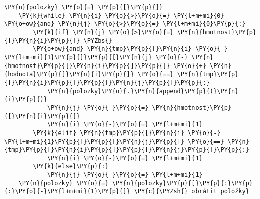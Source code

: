 \begin{Verbatim}[commandchars=\\\{\}]
	\PY{n}{polozky} \PY{o}{=} \PY{p}{[}\PY{p}{]}
	\PY{k}{while} \PY{n}{i} \PY{o}{>}\PY{o}{=} \PY{l+m+mi}{0} \PY{o+ow}{and} \PY{n}{j} \PY{o}{>}\PY{o}{=} \PY{l+m+mi}{0}\PY{p}{:}
		\PY{k}{if} \PY{n}{j} \PY{o}{>}\PY{o}{=} \PY{n}{hmotnost}\PY{p}{[}\PY{n}{i}\PY{p}{]} \PYZbs{}
		\PY{o+ow}{and} \PY{n}{tmp}\PY{p}{[}\PY{n}{i} \PY{o}{-} \PY{l+m+mi}{1}\PY{p}{]}\PY{p}{[}\PY{n}{j} \PY{o}{-} \PY{n}{hmotnost}\PY{p}{[}\PY{n}{i}\PY{p}{]}\PY{p}{]} \PY{o}{+} \PY{n}{hodnota}\PY{p}{[}\PY{n}{i}\PY{p}{]} \PY{o}{==} \PY{n}{tmp}\PY{p}{[}\PY{n}{i}\PY{p}{]}\PY{p}{[}\PY{n}{j}\PY{p}{]}\PY{p}{:}
			\PY{n}{polozky}\PY{o}{.}\PY{n}{append}\PY{p}{(}\PY{n}{i}\PY{p}{)}
			\PY{n}{j} \PY{o}{-}\PY{o}{=} \PY{n}{hmotnost}\PY{p}{[}\PY{n}{i}\PY{p}{]}
			\PY{n}{i} \PY{o}{-}\PY{o}{=} \PY{l+m+mi}{1}
		\PY{k}{elif} \PY{n}{tmp}\PY{p}{[}\PY{n}{i} \PY{o}{-} \PY{l+m+mi}{1}\PY{p}{]}\PY{p}{[}\PY{n}{j}\PY{p}{]} \PY{o}{==} \PY{n}{tmp}\PY{p}{[}\PY{n}{i}\PY{p}{]}\PY{p}{[}\PY{n}{j}\PY{p}{]}\PY{p}{:}
			\PY{n}{i} \PY{o}{-}\PY{o}{=} \PY{l+m+mi}{1}
		\PY{k}{else}\PY{p}{:}
			\PY{n}{j} \PY{o}{-}\PY{o}{=} \PY{l+m+mi}{1}
	\PY{n}{polozky} \PY{o}{=} \PY{n}{polozky}\PY{p}{[}\PY{p}{:}\PY{p}{:}\PY{o}{-}\PY{l+m+mi}{1}\PY{p}{]} \PY{c}{\PYZsh{} obrátit položky}
\end{Verbatim}
